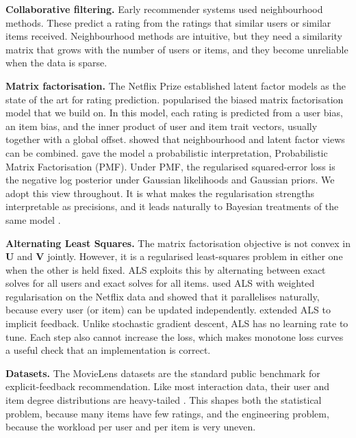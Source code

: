 \documentclass{article}
\theoremstyle{plain}
\theoremstyle{definition}
\theoremstyle{remark}
\begin{document}
\textbf{Collaborative filtering.}
Early recommender systems used neighbourhood methods. These predict a rating
from the ratings that similar users \cite{goldberg1992tapestry} or similar
items \cite{sarwar2001item} received. Neighbourhood methods are intuitive, but
they need a similarity matrix that grows with the number of users or items,
and they become unreliable when the data is sparse.

\textbf{Matrix factorisation.}
The Netflix Prize \cite{bennett2007netflix} established latent factor models
as the state of the art for rating prediction. \citet{koren2009matrix}
popularised the biased matrix factorisation model that we build on. In this
model, each rating is predicted from a user bias, an item bias, and the
inner product of user and item trait vectors, usually together with a
global offset. \citet{koren2008factorization} showed that neighbourhood and
latent factor views can be combined. \citet{salakhutdinov2008probabilistic}
gave the model a probabilistic interpretation, Probabilistic Matrix
Factorisation (PMF). Under PMF, the regularised squared-error loss is the
negative log posterior under Gaussian likelihoods and Gaussian priors. We
adopt this view throughout. It is what makes the regularisation strengths
interpretable as precisions, and it leads naturally to Bayesian treatments
of the same model \cite{salakhutdinov2008bayesian}.

\textbf{Alternating Least Squares.}
The matrix factorisation objective is not convex in $\mathbf{U}$ and
$\mathbf{V}$ jointly. However, it is a regularised least-squares problem in
either one when the other is held fixed. ALS exploits this by alternating
between exact solves for all users and exact solves for all items.
\citet{zhou2008large} used ALS with weighted regularisation on the Netflix
data and showed that it parallelises naturally, because every user (or
item) can be updated independently. \citet{hu2008collaborative} extended
ALS to implicit feedback. Unlike stochastic gradient descent, ALS has no
learning rate to tune. Each step also cannot increase the loss, which makes
monotone loss curves a useful check that an implementation is correct.

\textbf{Datasets.}
The MovieLens datasets \cite{harper2015movielens} are the standard public
benchmark for explicit-feedback recommendation. Like most interaction data,
their user and item degree distributions are heavy-tailed
\cite{clauset2009power}. This shapes both the statistical problem, because
many items have few ratings, and the engineering problem, because the
workload per user and per item is very uneven.
\end{document}
